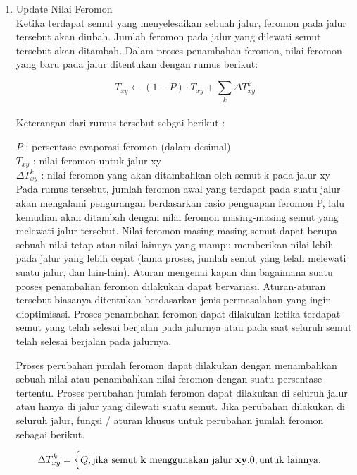 \begin{enumerate}
	\item Update Nilai Feromon\\
	Ketika terdapat semut yang menyelesaikan sebuah jalur, feromon pada jalur tersebut akan diubah.
	Jumlah feromon pada jalur yang dilewati semut tersebut akan ditambah. Dalam proses penambahan
	feromon, nilai feromon yang baru pada jalur ditentukan dengan rumus berikut:
	
	\begin{equation}
	T_{xy} \leftarrow (1-P) \cdot T_{xy} + \sum_{k}\Delta T_{xy}^k
	\end{equation}\\
	
	Keterangan dari rumus tersebut sebgai berikut :
	
	$P$ : persentase evaporasi feromon (dalam desimal)\\
	$T_{xy}$ : nilai feromon untuk jalur xy\\
	$\Delta T_{xy}^k$ : nilai feromon yang akan ditambahkan oleh semut k pada jalur xy\\
	
	Pada rumus tersebut, jumlah feromon awal yang terdapat pada suatu jalur akan mengalami
	pengurangan berdasarkan rasio penguapan feromon P, lalu kemudian akan ditambah dengan nilai
	feromon masing-masing semut yang melewati jalur tersebut. Nilai feromon masing-masing semut
	dapat berupa sebuah nilai tetap atau nilai lainnya yang mampu memberikan nilai lebih pada jalur
	yang lebih cepat (lama proses, jumlah semut yang telah melewati suatu jalur, dan lain-lain).
	Aturan mengenai kapan dan bagaimana suatu proses penambahan feromon dilakukan dapat
	bervariasi. Aturan-aturan tersebut biasanya ditentukan berdasarkan jenis permasalahan yang ingin
	dioptimisasi. Proses penambahan feromon dapat dilakukan ketika terdapat semut yang telah selesai
	berjalan pada jalurnya atau pada saat seluruh semut telah selesai berjalan pada jalurnya. 
	
	Proses perubahan jumlah feromon dapat dilakukan dengan menambahkan sebuah nilai atau penambahkan
	nilai feromon dengan suatu persentase tertentu.
	Proses perubahan jumlah feromon dapat dilakukan di seluruh jalur atau hanya di jalur yang
	dilewati suatu semut. Jika perubahan dilakukan di seluruh jalur, fungsi / aturan khusus untuk
	perubahan jumlah feromon sebagai berikut.
	
	\begin{equation}
	\Delta T_{xy}^k = \begin{cases}
	Q, \mbox{jika semut {\bf k} menggunakan jalur {\bf xy}} .\newline
	0, \mbox{untuk lainnya}.
	\end{cases}
	\end{equation}\\
	

\end{enumerate}
